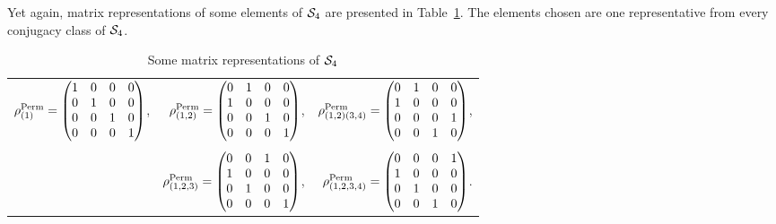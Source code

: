 	\begin{example}
		Yet again, matrix representations of some elements of $\mathcal{S}_4$ are presented in Table~\ref{table:permS4}. The elements chosen are one representative from every conjugacy class of $\mathcal{S}_4$.
		\begin{table}[hbt!]
			\centering
			\begin{tabular}{r r r}
				$\rho_{(1)}^{\text{Perm}} = \left(\begin{matrix}
					1 & 0 & 0 & 0 \\
					0 & 1 & 0 & 0 \\
					0 & 0 & 1 & 0 \\
					0 & 0 & 0 & 1
				\end{matrix}\right)$,  &
				$\rho_{(1,2)}^{\text{Perm}} = \left(\begin{matrix}
					0 & 1 & 0 & 0 \\
					1 & 0 & 0 & 0 \\
					0 & 0 & 1 & 0 \\
					0 & 0 & 0 & 1
				\end{matrix}\right)$, &
				$\rho_{(1,2)(3,4)}^{\text{Perm}} = \left(\begin{matrix}
					0 & 1 & 0 & 0 \\
					1 & 0 & 0 & 0 \\
					0 & 0 & 0 & 1 \\
					0 & 0 & 1 & 0
				\end{matrix}\right)$, \\ & & \\ &
				$\rho_{(1,2,3)}^{\text{Perm}} = \left(\begin{matrix}
					0 & 0 & 1 & 0 \\
					1 & 0 & 0 & 0 \\
					0 & 1 & 0 & 0 \\
					0 & 0 & 0 & 1
				\end{matrix}\right)$, &
				$\rho_{(1,2,3,4)}^{\text{Perm}} = \left(\begin{matrix}
					0 & 0 & 0 & 1 \\
					1 & 0 & 0 & 0 \\
					0 & 1 & 0 & 0 \\
					0 & 0 & 1 & 0
				\end{matrix}\right)$.
			\end{tabular}
			\caption{Some matrix representations of $\mathcal{S}_4$}
			\label{table:permS4}
		\end{table}
	\end{example}

